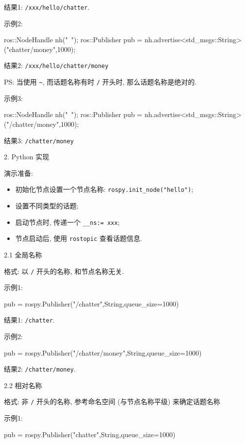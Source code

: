 \documentclass[openany, fontset=windowsold]{ctexbook}
\theoremstyle{kaiti}
\theoremstyle{normal}
\begin{document}
结果1: \verb|/xxx/hello/chatter|.

示例2:

\begin{cpp}
  ros::NodeHandle nh("~");
  ros::Publisher pub = nh.advertise<std_msgs::String>("chatter/money",1000);
\end{cpp}

结果2: \verb|/xxx/hello/chatter/money|

PS: 当使用 \verb|~|, 而话题名称有时 \verb|/| 开头时, 那么话题名称是绝对的.

示例3:

\begin{cpp}
  ros::NodeHandle nh("~");
  ros::Publisher pub = nh.advertise<std_msgs::String>("/chatter/money",1000);
\end{cpp}

结果3: \verb|/chatter/money|

2. Python 实现

演示准备:

\begin{itemize}
  \item 初始化节点设置一个节点名称: \verb|rospy.init_node("hello")|;
  \item 设置不同类型的话题;
  \item 启动节点时, 传递一个 \verb|__ns:= xxx|;
  \item 节点启动后, 使用 \verb|rostopic| 查看话题信息.
\end{itemize}

2.1 全局名称

格式: 以 \verb|/| 开头的名称, 和节点名称无关.

示例1:

\begin{python}
pub = rospy.Publisher("/chatter",String,queue_size=1000)
\end{python}

结果1: \verb|/chatter|.

示例2:

\begin{python}
pub = rospy.Publisher("/chatter/money",String,queue_size=1000)
\end{python}

结果2: \verb|/chatter/money|.

2.2 相对名称

格式: 非 \verb|/| 开头的名称, 参考命名空间 (与节点名称平级) 来确定话题名称

示例1:

\begin{python}
pub = rospy.Publisher("chatter",String,queue_size=1000)
\end{python}
\end{document}
